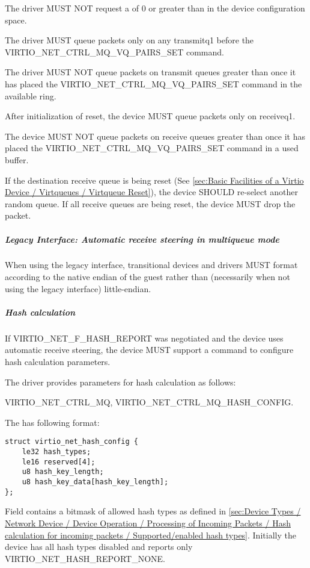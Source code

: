 The driver MUST NOT request a  of 0 or
greater than  in the device configuration space.

The driver MUST queue packets only on any transmitq1 before the 
VIRTIO_NET_CTRL_MQ_VQ_PAIRS_SET command.

The driver MUST NOT queue packets on transmit queues greater than
 once it has placed the VIRTIO_NET_CTRL_MQ_VQ_PAIRS_SET command in the available ring.


After initialization of reset, the device MUST queue packets only on receiveq1.

The device MUST NOT queue packets on receive queues greater than
 once it has placed the
VIRTIO_NET_CTRL_MQ_VQ_PAIRS_SET command in a used buffer.

If the destination receive queue is being reset (See \ref{sec:Basic Facilities of a Virtio Device / Virtqueues / Virtqueue Reset}),
the device SHOULD re-select another random queue. If all receive queues are
being reset, the device MUST drop the packet.

\subparagraph{Legacy Interface: Automatic receive steering in multiqueue mode}\label{sec:Device Types / Network Device / Device Operation / Control Virtqueue / Automatic receive steering in multiqueue mode / Legacy Interface: Automatic receive steering in multiqueue mode}
When using the legacy interface, transitional devices and drivers
MUST format 
according to the native endian of the guest rather than
(necessarily when not using the legacy interface) little-endian.

\subparagraph{Hash calculation}\label{sec:Device Types / Network Device / Device Operation / Control Virtqueue / Automatic receive steering in multiqueue mode / Hash calculation}
If VIRTIO_NET_F_HASH_REPORT was negotiated and the device uses automatic receive steering,
the device MUST support a command to configure hash calculation parameters.

The driver provides parameters for hash calculation as follows:

 VIRTIO_NET_CTRL_MQ,  VIRTIO_NET_CTRL_MQ_HASH_CONFIG.

The  has following format:
\begin{lstlisting}
struct virtio_net_hash_config {
    le32 hash_types;
    le16 reserved[4];
    u8 hash_key_length;
    u8 hash_key_data[hash_key_length];
};
\end{lstlisting}
Field  contains a bitmask of allowed hash types as
defined in
\ref{sec:Device Types / Network Device / Device Operation / Processing of Incoming Packets / Hash calculation for incoming packets / Supported/enabled hash types}.
Initially the device has all hash types disabled and reports only VIRTIO_NET_HASH_REPORT_NONE.

